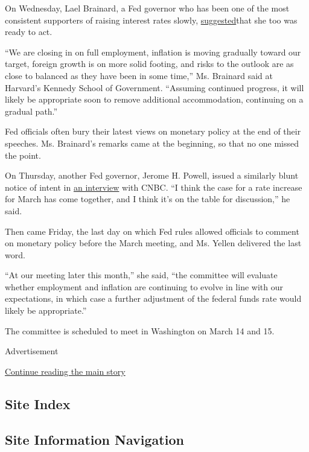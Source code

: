 On Wednesday, Lael Brainard, a Fed governor who has been one of the most
consistent supporters of raising interest rates slowly,
\href{https://www.federalreserve.gov/newsevents/speech/brainard20170301a.htm}{suggested}that
she too was ready to act.

``We are closing in on full employment, inflation is moving gradually
toward our target, foreign growth is on more solid footing, and risks to
the outlook are as close to balanced as they have been in some time,''
Ms. Brainard said at Harvard's Kennedy School of Government. ``Assuming
continued progress, it will likely be appropriate soon to remove
additional accommodation, continuing on a gradual path.''

Fed officials often bury their latest views on monetary policy at the
end of their speeches. Ms. Brainard's remarks came at the beginning, so
that no one missed the point.

On Thursday, another Fed governor, Jerome H. Powell, issued a similarly
blunt notice of intent in
\href{http://www.cnbc.com/2017/03/02/feds-powell-the-case-for-a-rate-increase-for-march-has-come-together.html}{an
interview} with CNBC. ``I think the case for a rate increase for March
has come together, and I think it's on the table for discussion,'' he
said.

Then came Friday, the last day on which Fed rules allowed officials to
comment on monetary policy before the March meeting, and Ms. Yellen
delivered the last word.

``At our meeting later this month,'' she said, ``the committee will
evaluate whether employment and inflation are continuing to evolve in
line with our expectations, in which case a further adjustment of the
federal funds rate would likely be appropriate.''

The committee is scheduled to meet in Washington on March 14 and 15.

Advertisement

\protect\hyperlink{after-bottom}{Continue reading the main story}

\hypertarget{site-index}{%
\subsection{Site Index}\label{site-index}}

\hypertarget{site-information-navigation}{%
\subsection{Site Information
Navigation}\label{site-information-navigation}}

